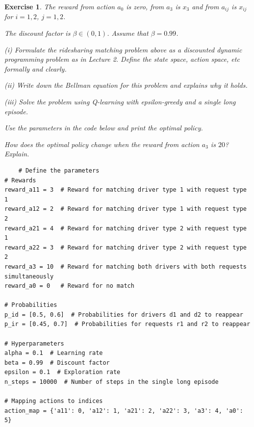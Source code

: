 \documentclass[letter,11pt]{article}
\newtheorem{exercise}{Exercise}[section]
\begin{document}
\begin{exercise}
The reward from action $a_{0}$ is zero, from $a_{3}$ is $x_{3}$ and from $a_{ij}$ is $x_{ij}$ for $i=1,2$, $j=1,2$. 

The discount factor is $\beta \in (0,1)$. Assume that $\beta = 0.99$. 

(i) Formulate the ridesharing matching problem above as a discounted dynamic programming problem as in Lecture 2. Define the state space, action space, etc formally and clearly. 

(ii) Write down the Bellman equation for this problem and explains why it holds. 

(iii) Solve the problem using Q-learning with epsilon-greedy and a single long episode.

 Use the parameters in the code below and print the optimal policy. 

How does the optimal policy change when the reward from action $a_{3}$ is $20$?  Explain. 

\begin{lstlisting}
    # Define the parameters
# Rewards
reward_a11 = 3  # Reward for matching driver type 1 with request type 1
reward_a12 = 2  # Reward for matching driver type 1 with request type 2
reward_a21 = 4  # Reward for matching driver type 2 with request type 1
reward_a22 = 3  # Reward for matching driver type 2 with request type 2
reward_a3 = 10  # Reward for matching both drivers with both requests simultaneously
reward_a0 = 0   # Reward for no match

# Probabilities
p_id = [0.5, 0.6]  # Probabilities for drivers d1 and d2 to reappear
p_ir = [0.45, 0.7]  # Probabilities for requests r1 and r2 to reappear

# Hyperparameters
alpha = 0.1  # Learning rate
beta = 0.99  # Discount factor
epsilon = 0.1  # Exploration rate
n_steps = 10000  # Number of steps in the single long episode

# Mapping actions to indices
action_map = {'a11': 0, 'a12': 1, 'a21': 2, 'a22': 3, 'a3': 4, 'a0': 5}


\end{lstlisting}



\end{exercise}
\end{document}
